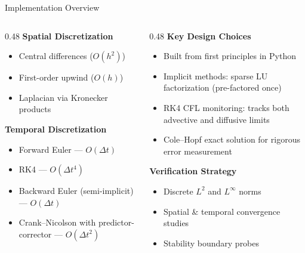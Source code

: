 \documentclass[aspectratio=169, 11pt]{beamer}
\begin{document}
\begin{frame}{Implementation Overview}
  \begin{columns}[T]
    \begin{column}{0.48\textwidth}
      \textbf{Spatial Discretization}
      \begin{itemize}
        \item Central differences ($O(h^2)$)
        \item First-order upwind ($O(h)$)
        \item Laplacian via Kronecker products
      \end{itemize}

      \bigskip
      \textbf{Temporal Discretization}
      \begin{itemize}
        \item Forward Euler --- $O(\Delta t)$
        \item RK4 --- $O(\Delta t^4)$
        \item Backward Euler (semi-implicit) --- $O(\Delta t)$
        \item Crank--Nicolson with predictor-corrector --- $O(\Delta t^2)$
      \end{itemize}
    \end{column}

    \begin{column}{0.48\textwidth}
      \textbf{Key Design Choices}
      \begin{itemize}
        \item Built from first principles in Python
        \item Implicit methods: sparse LU factorization (pre-factored once)
        \item RK4 CFL monitoring: tracks both advective and diffusive limits
        \item Cole--Hopf exact solution for rigorous error measurement
      \end{itemize}

      \bigskip
      \textbf{Verification Strategy}
      \begin{itemize}
        \item Discrete $L^2$ and $L^\infty$ norms
        \item Spatial \& temporal convergence studies
        \item Stability boundary probes
      \end{itemize}
    \end{column}
  \end{columns}
\end{frame}
\end{document}
